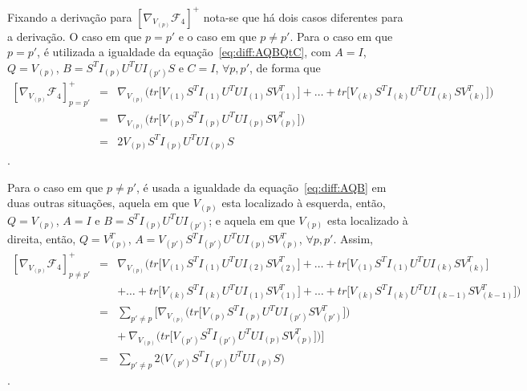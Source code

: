\documentclass[
    12pt,                %
    oneside,            %
    a4paper,            %
    english,            %
    brazil                %
    ]{abntex2ppgsi}
\begin{document}
Fixando a derivação para $[\nabla_{V_{(p)}} \mathcal{F}_4]^+$ nota-se que há dois casos diferentes para a derivação. O caso em que $p = p'$ e o caso em que $p \neq p'$. Para o caso em que $p = p'$, é utilizada a igualdade da equação~\ref{eq:diff:AQBQtC}, com $A = I$, $Q = V_{(p)}$, $B = S^T I_{(p)} U^T U I_{(p')} S$ e $C = I$, $\forall p, p'$, de forma que
\[
    \begin{array}{lcl}
        [\nabla_{V_{(p)}} \mathcal{F}_4]^{+}_{p=p'} & = & \nabla_{V_{(p)}} \Big( tr\big[ V_{(1)} S^T I_{(1)} U^T U I_{(1)} S V_{(1)}^T \big] + \dots + tr\big[ V_{(k)} S^T I_{(k)} U^T U I_{(k)} S V_{(k)}^T \big] \Big) \\
                                                    & = & \nabla_{V_{(p)}} \Big( tr\big[ V_{(p)} S^T I_{(p)} U^T U I_{(p)} S V_{(p)}^T \big] \Big)  \\
                                                    & = & 2 V_{(p)} S^T I_{(p)} U^T U I_{(p)} S
    \end{array}
\].

Para o caso em que $p \neq p'$, é usada a igualdade da equação~\ref{eq:diff:AQB} em duas outras situações, aquela em que $V_{(p)}$ esta localizado à esquerda, então, $Q = V_{(p)}$, $A = I$ e $B = S^T I_{(p)} U^T U I_{(p')}$; e aquela em que $V_{(p)}$ esta localizado à direita, então, $Q = V_{(p)}^T$, $A = V_{(p')} S^T I_{(p')} U^T U I_{(p)} S V_{(p)}^T$, $\forall p, p'$. Assim,
\[
    \begin{array}{lcl}
        [\nabla_{V_{(p)}} \mathcal{F}_4]^{+}_{p \neq p'} & = & \nabla_{V_{(p)}} \Big( tr\big[ V_{(1)} S^T I_{(1)} U^T U I_{(2)} S V_{(2)}^T \big] + \dots + tr\big[ V_{(1)} S^T I_{(1)} U^T U I_{(k)} S V_{(k)}^T \big] \\
                                   &   & + \dots + tr\big[ V_{(k)} S^T I_{(k)} U^T U I_{(1)} S V_{(1)}^T \big] + \dots + tr\big[ V_{(k)} S^T I_{(k)} U^T U I_{(k-1)} S V_{(k-1)}^T \big] \Big) \\
                                   & = & \sum_{p' \neq p} \bigg[ \nabla_{V_{(p)}} \Big( tr\big[ V_{(p)} S^T I_{(p)} U^T U I_{(p')} S V_{(p')}^T \big] \Big) \\
                                   &   & + ~ \nabla_{V_{(p)}} \Big( tr\big[ V_{(p')} S^T I_{(p')} U^T U I_{(p)} S V_{(p)}^T \big] \Big) \bigg] \\
                                   & = & \sum_{p' \neq p} 2 \big( V_{(p')} S^T I_{(p')} U^T U I_{(p)} S \big)
    \end{array}
\].
\end{document}
